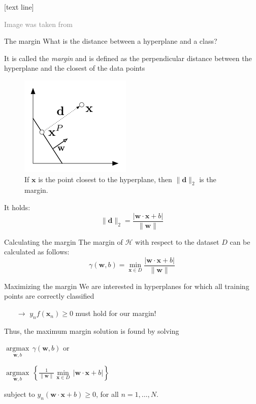 \documentclass[dvipsnames]{beamer}
\DeclareMathOperator*{\argmax}{argmax}
\newcommand{\referencefootnote}[1]{\setbeamertemplate{footline}[text line]{%
\parbox{0.9\paperwidth}{\vspace*{-23pt}\tiny{\textcolor{gray}{#1}}\hfill\scriptsize\insertframenumber}}}
\begin{document}
{ \referencefootnote{Image was taken from \cite{deisenroth_faisal_ong_2020}}
    \begin{frame}{The margin}
				What is the distance between a hyperplane and a class?
				
				It is called the \emph{margin} and is defined as the perpendicular distance between the hyperplane and the closest of the data points
				\begin{figure}
					\center
					\includegraphics[scale=.6]{figures/margin6.png}
					\caption{If $\mathbf{x}$ is the point closest to the hyperplane, then $\|\mathbf{d}\|_2$ is the margin.}
        \end{figure} %
				It holds:
				\[
				\|\mathbf{d}\|_2 = \frac{|\mathbf{w} \cdot \mathbf{x} + b|}{\|\mathbf{w}\|}
				\]
    \end{frame}
		}
		
		 \begin{frame}{Calculating the margin}
				The margin of $\mathcal{H}$ with respect to the dataset $D$ can be calculated as follows:
				\[
						\gamma(\mathbf{w},b) = \min_{\mathbf{x}\in D}\frac{|\mathbf{w} \cdot \mathbf{x} + b|}{\|\mathbf{w}\|}
				\]
     \end{frame}
		
		
		\begin{frame}{Maximizing the margin}
			We are interested in hyperplanes for which all training points are correctly classified %
			\begin{itemize}
				\item[$\rightarrow$] $y_{n} f(\mathbf{x}_n)\geq 0$ must hold for our margin! %
			\end{itemize}
			Thus, the maximum margin solution is found by solving
			
			 $\underset{\mathbf{w},b}{\argmax}\,\gamma(\mathbf{w},b) $ or %
			
			$\underset{\mathbf{w},b}{\argmax}\, \left\{\frac{1}{\|\mathbf{w}\|}\underset{\mathbf{x}\in D}{\min}\, |\mathbf{w} \cdot \mathbf{x} + b|\right\}$ %
			
			subject to $y_{n}(\mathbf{w} \cdot \mathbf{x} + b)\geq 0$, for all $n = 1, \dots,N$.
			
    \end{frame}
		
\end{document}
